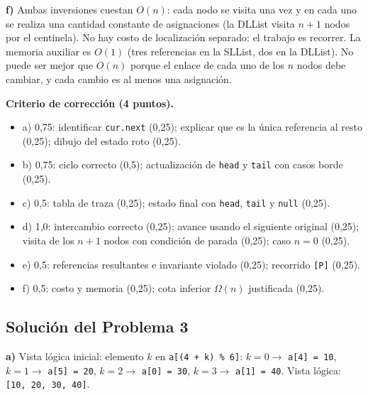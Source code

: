 \documentclass[11pt,a4paper]{article}
\begin{document}
\textbf{f)} Ambas inversiones cuestan $O(n)$: cada nodo se visita una vez y en cada uno se realiza una cantidad constante de asignaciones (la DLList visita $n + 1$ nodos por el centinela). No hay costo de localización separado: el trabajo es recorrer. La memoria auxiliar es $O(1)$ (tres referencias en la SLList, dos en la DLList). No puede ser mejor que $O(n)$ porque el enlace de cada uno de los $n$ nodos debe cambiar, y cada cambio es al menos una asignación.

\textbf{Criterio de corrección (4 puntos).}
\begin{itemize}[itemsep=0pt]
\item a) 0,75: identificar \texttt{cur.next} (0,25); explicar que es la única referencia al resto (0,25); dibujo del estado roto (0,25).
\item b) 0,75: ciclo correcto (0,5); actualización de \texttt{head} y \texttt{tail} con casos borde (0,25).
\item c) 0,5: tabla de traza (0,25); estado final con \texttt{head}, \texttt{tail} y \texttt{null} (0,25).
\item d) 1,0: intercambio correcto (0,25); avance usando el siguiente original (0,25); visita de los $n+1$ nodos con condición de parada (0,25); caso $n = 0$ (0,25).
\item e) 0,5: referencias resultantes e invariante violado (0,25); recorrido \texttt{[P]} (0,25).
\item f) 0,5: costo y memoria (0,25); cota inferior $\Omega(n)$ justificada (0,25).
\end{itemize}

\newpage
\subsection*{Solución del Problema 3}

\textbf{a)} Vista lógica inicial: elemento $k$ en \texttt{a[(4 + k) \% 6]}: $k=0 \to$ \texttt{a[4] = 10}, $k=1 \to$ \texttt{a[5] = 20}, $k=2 \to$ \texttt{a[0] = 30}, $k=3 \to$ \texttt{a[1] = 40}. Vista lógica: \texttt{[10, 20, 30, 40]}.
\end{document}
